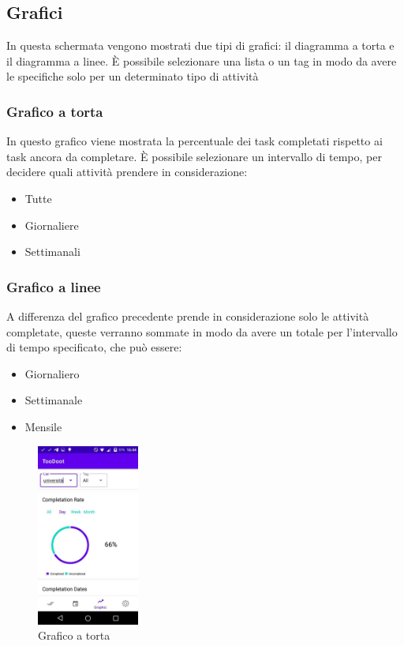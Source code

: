 \documentclass[]{article}
\providecommand{\tightlist}{%
  \setlength{\itemsep}{0pt}\setlength{\parskip}{0pt}}
\begin{document}
\hypertarget{grafici}{%
\subsection{Grafici}\label{grafici}}

In questa schermata vengono mostrati due tipi di grafici: il diagramma a
torta e il diagramma a linee. È possibile selezionare una lista o un tag
in modo da avere le specifiche solo per un determinato tipo di attività

\hypertarget{grafico-a-torta}{%
\subsubsection{Grafico a torta}\label{grafico-a-torta}}

In questo grafico viene mostrata la percentuale dei task completati
rispetto ai task ancora da completare. È possibile selezionare un
intervallo di tempo, per decidere quali attività prendere in
considerazione:

\begin{itemize}
\tightlist
\item
  Tutte
\item
  Giornaliere
\item
  Settimanali
\end{itemize}

\hypertarget{grafico-a-linee}{%
\subsubsection{Grafico a linee}\label{grafico-a-linee}}

A differenza del grafico precedente prende in considerazione solo le
attività completate, queste verranno sommate in modo da avere un totale
per l'intervallo di tempo specificato, che può essere:

\begin{itemize}
\tightlist
\item
  Giornaliero
\item
  Settimanale
\item
  Mensile
\end{itemize}

\begin{figure}
\centering
\includegraphics[width=0.3\textwidth,height=0.1\textheight]{./img/grafico_torta.jpg}
\caption{Grafico a torta}
\end{figure}
\end{document}
